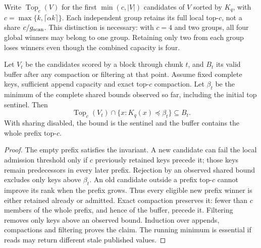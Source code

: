 Write $\operatorname{Top}_c(V)$ for the first $\min(c,|V|)$ candidates of
$V$ sorted by $K_q$, with $c=\max\{k,\lceil\alpha k\rceil\}$. Each
independent group retains its full local top-$c$, not a share $c/g_{\mathrm{scan}}$.
This distinction is necessary: with $c=4$ and two groups, all four
global winners may belong to one group. Retaining only two from each
group loses winners even though the combined capacity is four.

\begin{resultblock}
\begin{lemma}
\label{lem:5-buffer}
Let $V_t$ be the candidates scored by a block through chunk $t$, and
$B_t$ its valid buffer after any compaction or filtering at that point.
Assume fixed complete keys, sufficient append capacity and exact
top-$c$ compaction. Let $\beta_t$ be the minimum of the complete shared
bounds observed so far, including the initial top sentinel. Then
\begin{equation}
 \operatorname{Top}_c(V_t)\cap\{x:K_q(x)\preceq\beta_t\}
 \subseteq B_t.
 \label{eq:5-buffer-invariant}
\end{equation}
With sharing disabled, the bound is the sentinel and the buffer contains
the whole prefix top-$c$.
\end{lemma}
\begin{proof}
The empty prefix satisfies the invariant. A new candidate can fail the
local admission threshold only if $c$ previously retained keys precede
it; those keys remain predecessors in every later prefix. Rejection by
an observed shared bound excludes only keys above $\beta_t$. An old
candidate outside a prefix top-$c$ cannot improve its rank when the
prefix grows. Thus every eligible new prefix winner is either retained
already or admitted. Exact compaction preserves it: fewer than $c$
members of the whole prefix, and hence of the buffer, precede it.
Filtering removes only keys above an observed bound. Induction over
appends, compactions and filtering proves the claim. The running minimum
is essential if reads may return different stale published values.
\end{proof}
\end{resultblock}

